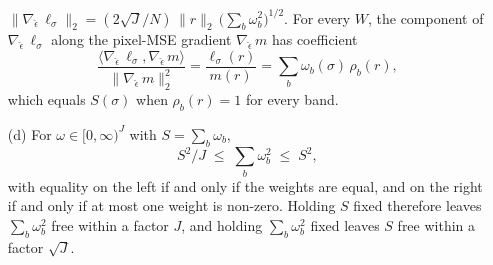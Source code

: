 \begin{proposition}
\begin{enumerate}
  $\lVert \nabla_{\hat\epsilon}\, \ell_\sigma \rVert_2 = (2\sqrt{J}/N)\,\lVert r \rVert_2\,\big(\sum_b \omega_b^2\big)^{1/2}$.
  For every $W$, the component of $\nabla_{\hat\epsilon}\, \ell_\sigma$ along
  the pixel-MSE gradient $\nabla_{\hat\epsilon}\, m$ has coefficient
  \begin{equation}
    \frac{\langle \nabla_{\hat\epsilon}\, \ell_\sigma, \nabla_{\hat\epsilon}\, m \rangle}
         {\lVert \nabla_{\hat\epsilon}\, m \rVert_2^2}
    = \frac{\ell_\sigma(r)}{m(r)} = \sum_b \omega_b(\sigma)\,\rho_b(r),
    \label{eq:mse-component}
  \end{equation}
  which equals $S(\sigma)$ when $\rho_b(r) = 1$ for every band.
  \item[(d)] For $\omega \in [0,\infty)^J$ with $S = \sum_b \omega_b$,
  \begin{equation}
    S^2/J \;\le\; \textstyle\sum_b \omega_b^2 \;\le\; S^2 ,
    \label{eq:cs-bounds}
  \end{equation}
  with equality on the left if and only if the weights are equal, and on the
  right if and only if at most one weight is non-zero. Holding $S$ fixed
  therefore leaves $\sum_b \omega_b^2$ free within a factor $J$, and holding
  $\sum_b \omega_b^2$ fixed leaves $S$ free within a factor $\sqrt{J}$.
\end{enumerate}
\end{proposition}

